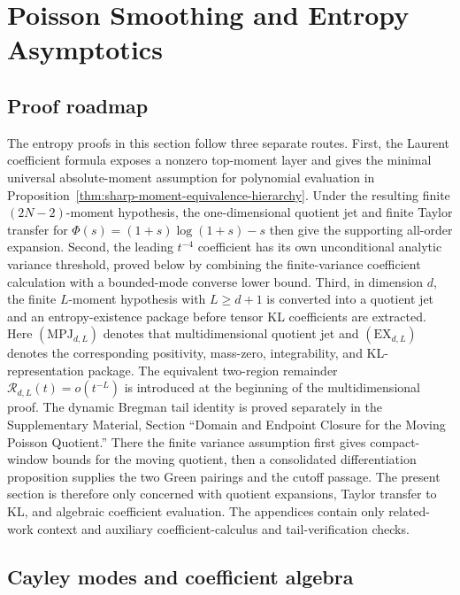 \section{Poisson Smoothing and Entropy Asymptotics}%
\label{sec:entropy-asymptotics}

\subsection*{Proof roadmap}
\label{sec:entropy-theorem-map}
\label{subsec:intro-hypotheses-scope}

The entropy proofs in this section follow three separate routes.  First, the
Laurent coefficient formula exposes a nonzero top-moment layer and gives the
minimal universal absolute-moment assumption for polynomial evaluation in
Proposition~\ref{thm:sharp-moment-equivalence-hierarchy}.  Under the resulting
finite \((2N-2)\)-moment hypothesis, the one-dimensional quotient jet and
finite Taylor transfer for \(\Phi(s)=(1+s)\log(1+s)-s\) then give the
supporting all-order expansion.  Second, the leading \(t^{-4}\) coefficient
has its own unconditional analytic variance threshold, proved below by
combining the finite-variance coefficient calculation with a bounded-mode
converse lower bound.  Third, in dimension \(d\), the finite
\(L\)-moment hypothesis with \(L\ge d+1\) is converted into a quotient jet and
an entropy-existence package before tensor KL coefficients are extracted.
Here \((\mathrm{MPJ}_{d,L})\) denotes that multidimensional quotient jet and
\((\mathrm{EX}_{d,L})\) denotes the corresponding positivity, mass-zero,
integrability, and KL-representation package.  The equivalent two-region
  remainder \(\mathcal R_{d,L}(t)=o(t^{-L})\) is introduced at the beginning of
the multidimensional proof.
The dynamic Bregman tail identity is proved separately in the
Supplementary Material, Section ``Domain and Endpoint Closure for the
Moving Poisson Quotient.''  There the finite variance assumption
first gives compact-window bounds for the moving quotient, then a consolidated
differentiation proposition supplies the two Green pairings and the cutoff
passage.  The present section is therefore only concerned with quotient
expansions, Taylor transfer to KL, and algebraic coefficient evaluation.
The appendices contain only related-work context and auxiliary
coefficient-calculus and tail-verification checks.

\subsection{Cayley modes and coefficient algebra}


